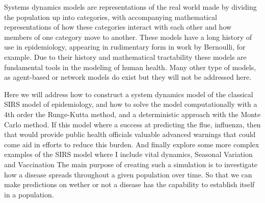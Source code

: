 
Systems dynamics models are representations of the real world made by dividing the population up into categories, with accompanying mathematical representations of how these categories interact with each other and how members of one category move to another. These models have a long history of use in epidemiology, appearing in rudimentary form in work by Bernoulli, for example. Due to their history and mathematical tractability these models are fundamental tools in the modeling of human health. Many other type of models, as agent-based or network models do exist but they will not be addressed here. 

	Here we will address how to construct a system dynamics model of the classical SIRS model of epidemiology, and how to solve the model computationally with a 4th order the Runge-Kutta method, and a deterministic approach with the Monte Carlo method. If this model where a success at predicting the flue, influenza, then that would provide public health officials valuable advanced warnings that could come aid in efforts to reduce this burden.\cite{yang2014comparison} And finally explore some more complex examples of the SIRS model where I include vital dynamics, Seasonal Variation and Vaccination	
	The main purpose of creating such a simulation is to investigate how a disease spreads throughout a given population over time. So that we can make predictions on wether or not a disease has the capability to establish itself in a population. 